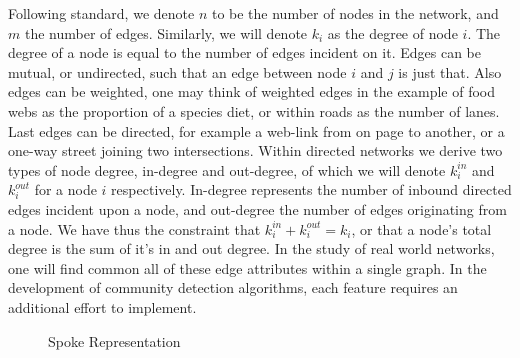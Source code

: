 \documentclass[a4paper, 10pt, twocolumn]{article}
\begin{document}
Following standard, we denote $ n $ to be the number of nodes in the network, and $ m $ the number of edges.
Similarly, we will denote $ k_i $ as the degree of node $ i $.
The degree of a node is equal to the number of edges incident on it.
Edges can be mutual, or undirected, such that an edge between node $ i $ and $ j $ is just that.
Also edges can be weighted, one may think of weighted edges in the example of food webs as the proportion of a species diet, or within roads as the number of lanes.
Last edges can be directed, for example a web-link from on page to another, or a one-way street joining two intersections.
Within directed networks we derive two types of node degree, in-degree and out-degree, of which we will denote $ k_{i}^{in} $ and $ k_{i}^{out} $ for a node $ i $ respectively.
In-degree represents the number of inbound directed edges incident upon a node, and out-degree the number of edges originating from a node.
We have thus the constraint that $ k_{i}^{in} + k_{i}^{out} = k_{i} $, or that a node's total degree is the sum of it's in and out degree.
In the study of real world networks, one will find common all of these edge attributes within a single graph.
In the development of community detection algorithms, each feature requires an additional effort to implement.

\begin{figure}[b]
       \centering
       \caption{Spoke Representation}
       \label{fig:spokes}
\end{figure}
\end{document}
